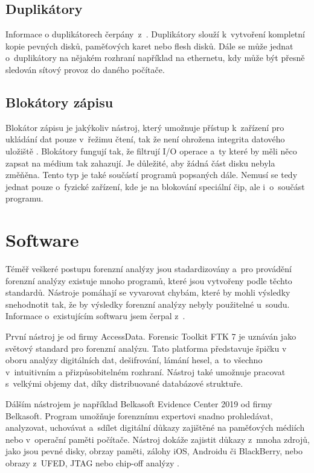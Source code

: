 \documentclass[thesis=B,czech]{FITthesis}[2012/06/26]
\begin{document}
\subsection{Duplikátory}
\label{duplikatory}
Informace o duplikátorech čerpány~z~\cite{for_hard}. Duplikátory slouží k~vytvoření kompletní kopie pevných disků, paměťových karet nebo flesh disků. Dále se může jednat o~duplikátory na nějakém rozhraní například na ethernetu, kdy může být přesně sledován sítový provoz do daného počítače.
\subsection{Blokátory zápisu}
\label{blokatory}
Blokátor zápisu je jakýkoliv nástroj, který umožnuje přístup k~zařízení pro ukládání dat pouze v~řežimu čtení, tak že není ohrožena integrita datového uložiště \cite{for_hard2}. Blokátory fungují tak, že filtrují I/O operace a~ty které by měli něco zapsat na médium tak zahazují. Je důležité, aby žádná část disku nebyla změňěna. Tento typ je také součástí programů popsaných dále. Nemusí se tedy jednat pouze o~fyzické zařízení, kde je na blokování speciální čip, ale i~o~součást programu.

\section{Software}

Téměř veškeré postupu forenzní analýzy jsou stadardizovány a~pro provádění forenzní analýzy existuje mnoho programů, které jsou vytvořeny podle těchto standardů. Nástroje pomáhají se vyvarovat chybám, které by mohli výsledky snehodnotit tak, že by výsledky forenzní analýzy nebyly použitelné u~soudu. Informace o~existujícím softwaru jsem čerpal z~\cite{for_soft}.

První nástroj je od firmy AccessData. Forensic Toolkit FTK 7 je uznáván jako světový standard pro forenzní analýzu. Tato platforma představuje špičku v oboru analýzy digitálních dat, dešifrování, lámání hesel, a~to všechno v~intuitivním a přizpůsobitelném rozhraní. Nástroj také umožnuje pracovat s~velkými objemy dat, díky distribuované databázové struktuře.

Dálším nástrojem je například Belkasoft Evidence Center 2019 od firmy Belkasoft. Program umožňuje forenznímu expertovi snadno prohledávat, analyzovat, uchovávat a~sdílet digitální důkazy zajištěné na paměťových médiích nebo v~operační paměti počítače. Nástroj dokáže zajistit důkazy z~mnoha zdrojů, jako jsou pevné disky, obrzay paměti, zálohy iOS, Androidu či BlackBerry, nebo obrazy z~UFED, JTAG nebo chip-off analýzy \cite{for_soft}.
\end{document}
